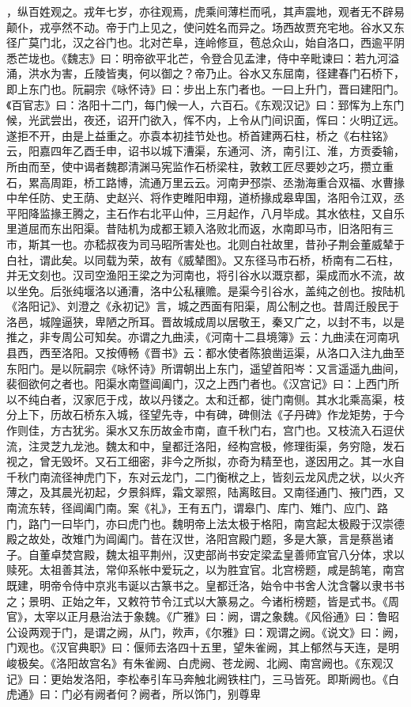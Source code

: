 \documentclass[12pt,UTF8]{ctexbook}
\begin{document}
，纵百姓观之。戎年七岁，亦往观焉，虎乘间薄栏而吼，其声震地，观者无不辟易颠仆，戎亭然不动。帝于门上见之，使问姓名而异之。场西故贾充宅地。谷水又东径广莫门北，汉之谷门也。北对芒阜，连岭修亘，苞总众山，始自洛口，西逾平阴悉芒垅也。《魏志》曰：明帝欲平北芒，令登合见孟津，侍中辛毗谏曰：若九河溢涌，洪水为害，丘陵皆夷，何以御之？帝乃止。谷水又东屈南，径建春门石桥下，即上东门也。阮嗣宗《咏怀诗》曰：步出上东门者也。一曰上升门，晋曰建阳门。《百官志》曰：洛阳十二门，每门候一人，六百石。《东观汉记》曰：郅恽为上东门候，光武尝出，夜还，诏开门欲入，恽不内，上令从门间识面，恽曰：火明辽远。遂拒不开，由是上益重之。亦袁本初挂节处也。桥首建两石柱，桥之《右柱铭》云，阳嘉四年乙酉壬申，诏书以城下漕渠，东通河、济，南引江、淮，方贡委输，所由而至，使中谒者魏郡清渊马宪监作石桥梁柱，敦敕工匠尽要妙之巧，攒立重石，累高周距，桥工路博，流通万里云云。河南尹邳崇、丞渤海重合双福、水曹掾中牟任防、史王荫、史赵兴、将作吏睢阳申翔，道桥掾成皋卑国，洛阳令江双，丞平阳降监掾王腾之，主石作右北平山仲，三月起作，八月毕成。其水依柱，又自乐里道屈而东出阳渠。昔陆机为成都王颖入洛败北而返，水南即马市，旧洛阳有三市，斯其一也。亦嵇叔夜为司马昭所害处也。北则白社故里，昔孙子荆会董威辇于白社，谓此矣。以同载为荣，故有《威辇图》。又东径马市石桥，桥南有二石柱，并无文刻也。汉司空渔阳王梁之为河南也，将引谷水以溉京都，渠成而水不流，故以坐免。后张纯堰洛以通漕，洛中公私穰赡。是渠今引谷水，盖纯之创也。按陆机《洛阳记》、刘澄之《永初记》言，城之西面有阳渠，周公制之也。昔周迁殷民于洛邑，城隍逼狭，卑陋之所耳。晋故城成周以居敬王，秦又广之，以封不韦，以是推之，非专周公可知矣。亦谓之九曲渎，《河南十二县境簿》云：九曲渎在河南巩县西，西至洛阳。又按傅畅《晋书》云：都水使者陈狼凿运渠，从洛口入注九曲至东阳门。是以阮嗣宗《咏怀诗》所谓朝出上东门，遥望首阳岑：又言遥遥九曲间，裴徊欲何之者也。阳渠水南暨阊阖门，汉之上西门者也。《汉宫记》曰：上西门所以不纯白者，汉家厄于戍，故以丹镂之。太和迁都，徙门南侧。其水北乘高渠，枝分上下，历故石桥东入城，径望先寺，中有碑，碑侧法《子丹碑》作龙矩势，于今作则佳，方古犹劣。渠水又东历故金市南，直千秋门右，宫门也。又枝流入石逗伏流，注灵芝九龙池。魏太和中，皇都迁洛阳，经构宫极，修理街渠，务穷隐，发石视之，曾无毁坏。又石工细密，非今之所拟，亦奇为精至也，遂因用之。其一水自千秋门南流径神虎门下，东对云龙门，二门衡栿之上，皆刻云龙风虎之状，以火齐薄之，及其晨光初起，夕景斜辉，霜文翠照，陆离眩目。又南径通门、掖门西，又南流东转，径阊阖门南。案《礼》，王有五门，谓皋门、库门、雉门、应门、路门，路门一曰毕门，亦曰虎门也。魏明帝上法太极于格阳，南宫起太极殿于汉崇德殿之故处，改雉门为阊阖门。昔在汉世，洛阳宫殿门题，多是大篆，言是蔡邕诸子。自董卓焚宫殿，魏太祖平荆州，汉吏部尚书安定梁孟皇善师宜官八分体，求以赎死。太祖善其法，常仰系帐中爱玩之，以为胜宜官。北宫榜题，咸是鹄笔，南宫既建，明帝令侍中京兆韦诞以古篆书之。皇都迁洛，始令中书舍人沈含馨以隶书书之；景明、正始之年，又敕符节令江式以大篆易之。今诸桁榜题，皆是式书。《周官》，太宰以正月悬治法于象魏。《广雅》曰：阙，谓之象魏。《风俗通》曰：鲁昭公设两观于门，是谓之阙，从门，欮声，《尔雅》曰：观谓之阙。《说文》曰：阙，门观也。《汉官典职》曰：偃师去洛四十五里，望朱雀阙，其上郁然与天连，是明峻极矣。《洛阳故宫名》有朱雀阙、白虎阙、苍龙阙、北阙、南宫阙也。《东观汉记》曰：更始发洛阳，李松奉引车马奔触北阙铁柱门，三马皆死。即斯阙也。《白虎通》曰：门必有阙者何？阙者，所以饰门，别尊卑
\end{document}
